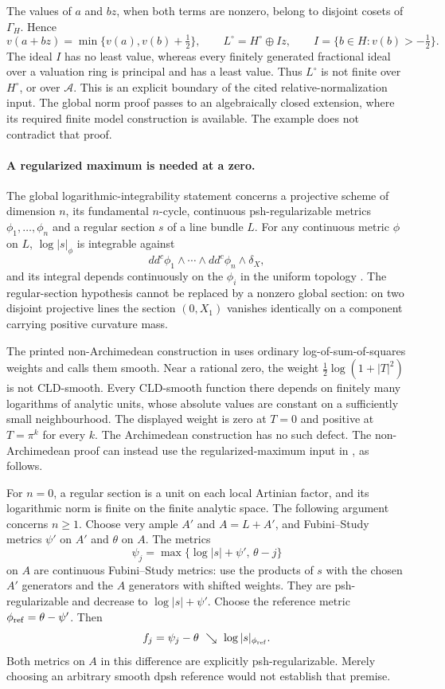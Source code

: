 The values of \(a\) and \(bz\), when both terms are nonzero, belong
to disjoint cosets of \(\Gamma_H\).  Hence
\[
 v(a+bz)=\min\{v(a),v(b)+\tfrac12\},\qquad
 L^\circ=H^\circ\oplus Iz,\qquad
 I=\{b\in H:v(b)>-\tfrac12\}.
\]
The ideal \(I\) has no least value, whereas every finitely
generated fractional ideal over a valuation ring is principal
and has a least value.  Thus \(L^\circ\) is not finite over
\(H^\circ\), or over \(\mathscr A\).
This is an explicit boundary of the cited relative-normalization
input.  The global norm proof passes to an algebraically closed
extension, where its required finite model construction is
available.  The example does not contradict that proof.

\paragraph{A regularized maximum is needed at a zero.}
The global logarithmic-integrability statement concerns a
projective scheme of dimension \(n\), its fundamental \(n\)-cycle,
continuous psh-regularizable metrics \(\phi_1,\ldots,\phi_n\)
and a regular section \(s\) of a line bundle \(L\).
For any continuous metric \(\phi\) on \(L\),
\(\log|s|_\phi\) is integrable against
\[
 dd^c\phi_1\wedge\cdots\wedge dd^c\phi_n\wedge\delta_X,
\]
and its integral depends continuously on the \(\phi_i\) in the
uniform topology \cite[Theorem~8.12]{BE21}.
The regular-section hypothesis cannot be replaced by a nonzero
global section: on two disjoint projective lines the section
\((0,X_1)\) vanishes identically on a component carrying positive
curvature mass.

The printed non-Archimedean construction in
\cite[Lemma~8.13]{BE21} uses ordinary log-of-sum-of-squares
weights and calls them smooth.  Near a rational zero, the weight
\(\frac12\log(1+|T|^2)\) is not CLD-smooth.
Every CLD-smooth function there depends on finitely many logarithms
of analytic units, whose absolute values are constant on a
sufficiently small neighbourhood.  The displayed weight is zero
at \(T=0\) and positive at \(T=\pi^k\) for every \(k\).
The Archimedean construction has no such defect.
The non-Archimedean proof can instead use the regularized-maximum
input in \cite[Example~7.12 and Theorem~7.14]{BE21}, as follows.

For \(n=0\), a regular section is a unit on each local Artinian
factor, and its logarithmic norm is finite on the finite analytic
space.  The following argument concerns \(n\ge1\).
Choose very ample \(A'\) and \(A=L+A'\), and Fubini--Study
metrics \(\psi'\) on \(A'\) and \(\theta\) on \(A\).
The metrics
\[
 \psi_j=\max\{\log|s|+\psi',\,\theta-j\}
\]
on \(A\) are continuous Fubini--Study metrics: use the products
of \(s\) with the chosen \(A'\) generators and the \(A\)
generators with shifted weights.
They are psh-regularizable and decrease to
\(\log|s|+\psi'\).
Choose the reference metric
\(\phi_{\rm ref}=\theta-\psi'\).  Then
\[
 f_j=\psi_j-\theta\ \searrow\
       \log|s|_{\phi_{\rm ref}}.
\]
Both metrics on \(A\) in this difference are explicitly
psh-regularizable.  Merely choosing an arbitrary smooth dpsh
reference would not establish that premise.

